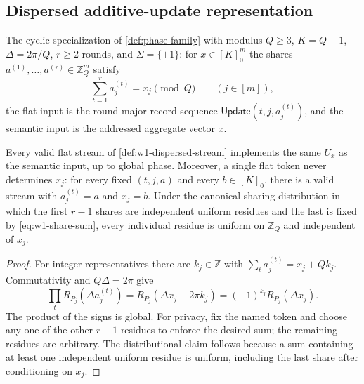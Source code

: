 \subsection{Dispersed additive-update representation}
\label{sec:w1-dispersed}

\begin{definition}
\label{def:w1-dispersed-stream}
The cyclic specialization of \cref{def:phase-family} with modulus
$Q\geq3$, $K=Q-1$, $\Delta=2\pi/Q$, $r\geq2$ rounds, and
$\Sigma=\{+1\}$: for $x\in[K]_0^m$ the shares
$a^{(1)},\ldots,a^{(r)}\in\mathbb Z_Q^m$ satisfy
\begin{equation}
 \sum_{t=1}^r a_j^{(t)}=x_j\pmod Q
 \qquad(j\in[m]),
 \label{eq:w1-share-sum}
\end{equation}
the flat input is the round-major record sequence
$\mathsf{Update}(t,j,a_j^{(t)})$, and the semantic input is the addressed
aggregate vector $x$.
\end{definition}

\begin{proposition}
\label{prop:w1-stream-equivalence}
Every valid flat stream of \cref{def:w1-dispersed-stream} implements the
same $U_x$ as the semantic input, up to global phase.  Moreover, a single
flat token never determines $x_j$: for every fixed $(t,j,a)$ and every
$b\in[K]_0$, there is a valid stream with $a_j^{(t)}=a$ and $x_j=b$.
Under the canonical sharing distribution in which the first $r-1$ shares
are independent uniform residues and the last is fixed by
\eqref{eq:w1-share-sum}, every individual residue is uniform on
$\mathbb Z_Q$ and independent of $x_j$.
\end{proposition}

\begin{proof}
For integer representatives there are $k_j\in\mathbb Z$ with
$\sum_ta_j^{(t)}=x_j+Qk_j$.  Commutativity and $Q\Delta=2\pi$ give
\begin{equation*}
 \prod_tR_{P_j}(\Delta a_j^{(t)})
 =R_{P_j}(\Delta x_j+2\pi k_j)
 =(-1)^{k_j}R_{P_j}(\Delta x_j).
\end{equation*}
The product of the signs is global.  For privacy, fix the named token and
choose any one of the other $r-1$ residues to enforce the desired sum;
the remaining residues are arbitrary.  The distributional claim follows
because a sum containing at least one independent uniform residue is
uniform, including the last share after conditioning on $x_j$.
\end{proof}

